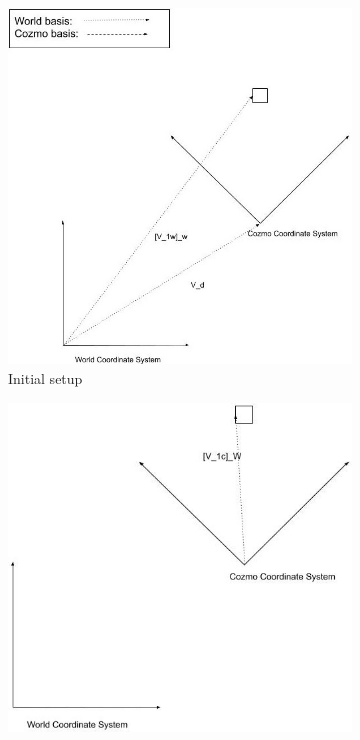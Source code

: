 \documentclass[jou,apacite]{apa6}
\begin{document}
\begin{figure}[h!]
	\centering
	\begin{subfigure}[b]{0.5\linewidth}
		\includegraphics[width=\linewidth]{wc1.jpg}
		\caption{Initial setup}
	\end{subfigure}
	\begin{subfigure}[b]{0.5\linewidth}
		\includegraphics[width=\linewidth]{wc2.jpg}

\end{subfigure}
\end{figure}
\end{document}
